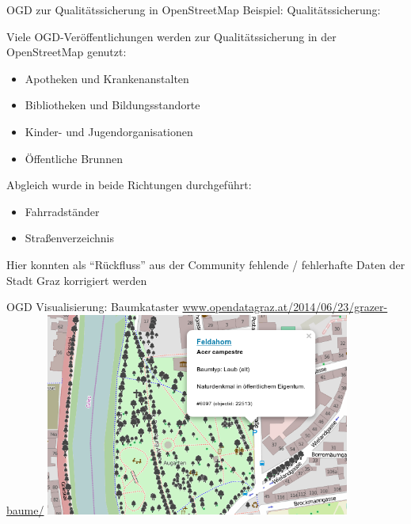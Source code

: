 \documentclass{beamer}
\begin{document}
\begin{frame}{OGD zur Qualitätssicherung in OpenStreetMap}
  Beispiel: Qualitätssicherung:
  \vspace*{0.2cm}

  Viele OGD-Veröffentlichungen werden zur Qualitätssicherung in der OpenStreetMap genutzt:
  \begin{itemize}
                  \item Apotheken und Krankenanstalten
                  \item Bibliotheken und Bildungsstandorte
                  \item Kinder- und Jugendorganisationen
                  \item Öffentliche Brunnen
              \end{itemize}
   Abgleich wurde in beide Richtungen durchgeführt:
  \begin{itemize}
                  \item Fahrradständer
                  \item Straßenverzeichnis
              \end{itemize}
                  
              Hier konnten als "`Rückfluss"' aus der Community fehlende / fehlerhafte Daten der Stadt Graz korrigiert werden

\end{frame}

\begin{frame}{OGD Visualisierung: Baumkataster}
    \href{http://www.opendatagraz.at/2014/06/23/grazer-baume/}{www.opendatagraz.at/2014/06/23/grazer-baume/}
    \includegraphics[width=10.0cm]{visualisierung-tyr.png}
\end{frame}
\end{document}

